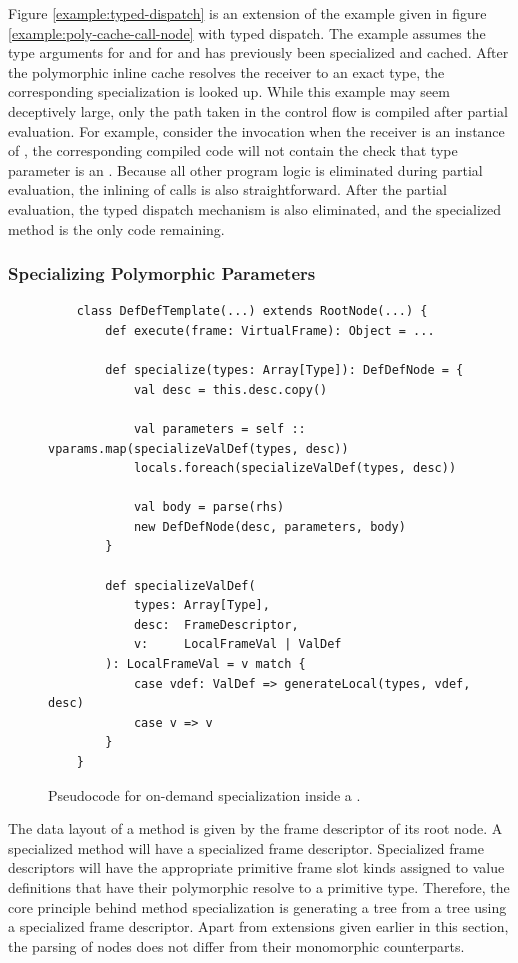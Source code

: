 Figure \ref{example:typed-dispatch} is an extension of the example given in figure \ref{example:poly-cache-call-node} with typed dispatch.
The example assumes the type arguments for  and  for  and  has previously been specialized and cached.
After the polymorphic inline cache resolves the receiver to an exact type, the corresponding specialization is looked up.
While this example may seem deceptively large, only the path taken in the control flow is compiled after partial evaluation.
For example, consider the invocation  when the receiver is an instance of , the corresponding compiled code will not contain the check that type parameter is an .
Because all other program logic is eliminated during partial evaluation, the inlining of calls is also straightforward.
After the partial evaluation, the typed dispatch mechanism is also eliminated, and the specialized method is the only code remaining.

\subsubsection*{Specializing Polymorphic Parameters}
\begin{figure}[!htb]
	\begin{verbatim}
	class DefDefTemplate(...) extends RootNode(...) {
		def execute(frame: VirtualFrame): Object = ...
			
		def specialize(types: Array[Type]): DefDefNode = {
			val desc = this.desc.copy()
				
			val parameters = self :: vparams.map(specializeValDef(types, desc))
			locals.foreach(specializeValDef(types, desc))
				
			val body = parse(rhs)
			new DefDefNode(desc, parameters, body)
		}
	
		def specializeValDef(
			types: Array[Type], 
			desc:  FrameDescriptor, 
			v:     LocalFrameVal | ValDef
		): LocalFrameVal = v match {
			case vdef: ValDef => generateLocal(types, vdef, desc)
			case v => v
		}
	}
	\end{verbatim}
	\caption{Pseudocode for on-demand specialization inside a .}
	\label{impl:defdeftemplate-specialize}
\end{figure}

The data layout of a method is given by the frame descriptor of its root node.
A specialized method will have a specialized frame descriptor.
Specialized frame descriptors will have the appropriate primitive frame slot kinds assigned to value definitions that have their polymorphic resolve to a primitive type.
Therefore, the core principle behind method specialization is generating a  tree from a  tree using a specialized frame descriptor.
Apart from extensions given earlier in this section, the parsing of  nodes does not differ from their monomorphic counterparts.

